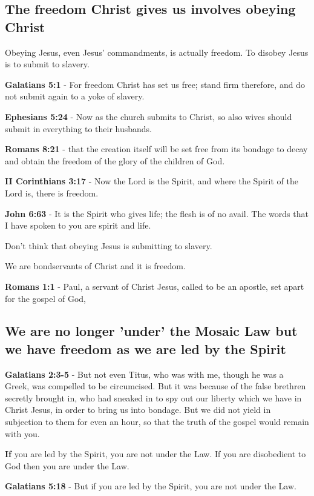 \documentclass[11pt]{article}
\begin{document}
\subsection{The freedom Christ gives us involves obeying Christ}
\label{sec:orge071a0e}

Obeying Jesus, even Jesus' commandments, is actually freedom. To disobey Jesus is to submit to slavery.

\textbf{Galatians 5:1} - For freedom Christ has set us free; stand firm therefore, and do not submit again to a yoke of slavery.

\textbf{Ephesians 5:24} - Now as the church submits to Christ, so also wives should submit in everything to their husbands.

\textbf{Romans 8:21} - that the creation itself will be set free from its bondage to decay and obtain the freedom of the glory of the children of God.

\textbf{II Corinthians 3:17} - Now the Lord is the Spirit, and where the Spirit of the Lord is, there is freedom.

\textbf{John 6:63} - It is the Spirit who gives life; the flesh is of no avail. The words that I have spoken to you are spirit and life.

Don't think that obeying Jesus is submitting to slavery.

We are bondservants of Christ and it is freedom.

\textbf{Romans 1:1} - Paul, a servant of Christ Jesus, called to be an apostle, set apart for the gospel of God,

\subsection{We are no longer 'under' the Mosaic Law but we have freedom as we are led by the Spirit}
\label{sec:org16dc4bd}

\textbf{Galatians 2:3-5} - But not even Titus, who was with me, though he was a Greek, was compelled to be circumcised. But it was because of the false brethren secretly brought in, who had sneaked in to spy out our liberty which we have in Christ Jesus, in order to bring us into bondage. But we did not yield in subjection to them for even an hour, so that the truth of the gospel would remain with you.

\textbf{If} you are led by the Spirit, you are not under the Law.
If you are disobedient to God then you are under the Law.

\textbf{Galatians 5:18} - But if you are led by the Spirit, you are not under the Law.
\end{document}
